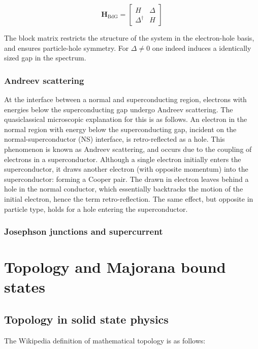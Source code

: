 		\begin{equation}
		\mathbf{H}_\text{BdG} = \begin{bmatrix} H & \Delta \\ \Delta^\dagger & H \end{bmatrix}
		\end{equation}

		The block matrix restricts the structure of the system in the electron-hole basis, and ensures particle-hole symmetry.
		For $\Delta \neq 0$ one indeed induces a identically sized gap in the spectrum.

		\subsubsection{Andreev scattering}
			At the interface between a normal and superconducting region, electrons with energies below the superconducting gap undergo Andreev scattering.
			The quasiclassical microscopic explanation for this is as follows.
			An electron in the normal region with energy below the superconducting gap, incident on the normal-superconductor (NS) interface, is retro-reflected as a hole.
			This phenomenon is known as Andreev scattering, and occurs due to the coupling of electrons in a superconductor.
			Although a single electron initially enters the superconductor, it draws another electron (with opposite momentum) into the superconductor: forming a Cooper pair.
			The drawn in electron leaves behind a hole in the normal conductor, which essentially backtracks the motion of the initial electron, hence the term retro-reflection.
			The same effect, but opposite in particle type, holds for a hole entering the superconductor.

		\subsubsection{Josephson junctions and supercurrent}
			

\section{Topology and Majorana bound states}
	\subsection{Topology in solid state physics}
	The Wikipedia definition of mathematical topology is as follows:
	
	\cite{noauthor_topology_2018}

